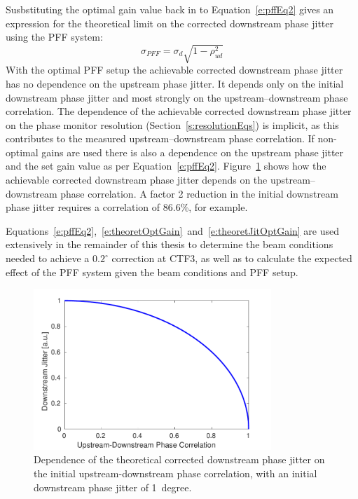 Susbstituting the optimal gain value back in to Equation~\ref{e:pffEq2} gives an expression for the theoretical limit on the corrected downstream phase jitter using the PFF system:
\begin{equation}
\sigma_{PFF} = \sigma_d\sqrt{1-\rho_{ud}^2}
\label{e:theoretJitOptGain}
\end{equation}
With the optimal PFF setup the achievable corrected downstream phase jitter has no dependence on the upstream phase jitter. It depends only on the initial downstream phase jitter and most strongly on the upstream--downstream phase correlation. The dependence of the achievable corrected downstream phase jitter on the phase monitor resolution (Section~\ref{s:resolutionEqs}) is implicit, as this contributes to the measured upstream--downstream phase correlation. If non-optimal gains are used there is also a dependence on the upstream phase jitter and the set gain value as per Equation~\ref{e:pffEq2}. Figure~\ref{f:theoretJitvsCorr} shows how the achievable corrected downstream phase jitter depends on the upstream--downstream phase correlation. A factor 2 reduction in the initial downstream phase jitter requires a correlation of 86.6\%, for example.

Equations~\ref{e:pffEq2},~\ref{e:theoretOptGain}~and~\ref{e:theoretJitOptGain} are used extensively in the remainder of this thesis to determine the beam conditions needed to achieve a \(0.2^\circ\) correction at CTF3, as well as to calculate the expected effect of the PFF system given the beam conditions and PFF setup.

\begin{figure}
  \centering
  \includegraphics[width=0.8\textwidth]{Figures/propagation/theoretJitvsCorr}
  \caption{Dependence of the theoretical corrected downstream phase jitter on the initial upstream-downstream phase correlation, with an initial downstream phase jitter of 1~degree.}
  \label{f:theoretJitvsCorr}
\end{figure}

